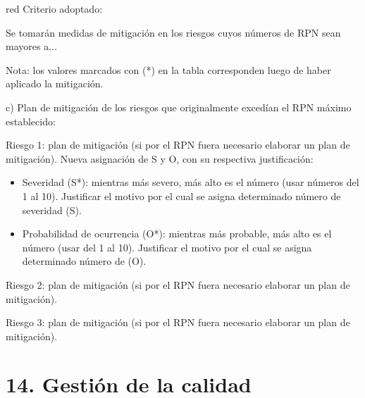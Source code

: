 \documentclass[
11pt, %
]{charter}
\begin{document}
\begin{consigna}{red}
Criterio adoptado: 

Se tomarán medidas de mitigación en los riesgos cuyos números de RPN sean mayores a...

Nota: los valores marcados con (*) en la tabla corresponden luego de haber aplicado la mitigación.

c) Plan de mitigación de los riesgos que originalmente excedían el RPN máximo establecido:
 
Riesgo 1: plan de mitigación (si por el RPN fuera necesario elaborar un plan de mitigación).
  Nueva asignación de S y O, con su respectiva justificación:
  \begin{itemize}
	\item Severidad (S*): mientras más severo, más alto es el número (usar números del 1 al 10).
          Justificar el motivo por el cual se asigna determinado número de severidad (S).
	\item Probabilidad de ocurrencia (O*): mientras más probable, más alto es el número (usar del 1 al 10).
          Justificar el motivo por el cual se asigna determinado número de (O).
	\end{itemize}

Riesgo 2: plan de mitigación (si por el RPN fuera necesario elaborar un plan de mitigación).
 
Riesgo 3: plan de mitigación (si por el RPN fuera necesario elaborar un plan de mitigación).

\end{consigna}


\section{14. Gestión de la calidad}
\label{sec:calidad}
\end{document}
